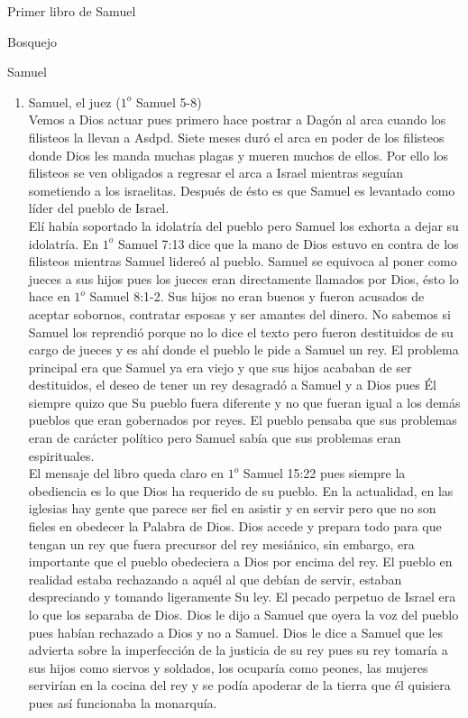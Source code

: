 \begin{section}{Primer libro de Samuel}
\begin{subsection}{Bosquejo}
\begin{subsubsection}{Samuel}
\begin{enumerate}
				\item Samuel, el juez ($1^{o}$ Samuel 5-8)\\
					Vemos a Dios actuar pues primero hace postrar a Dagón al arca cuando los filisteos la llevan a Asdpd. Siete meses duró el arca en poder de los filisteos donde Dios les manda muchas plagas y mueren muchos de ellos. Por ello los filisteos se ven obligados a regresar el arca a Israel mientras seguían sometiendo a los israelitas. Después de ésto es que Samuel es levantado como líder del pueblo de Israel. \\
					Elí había soportado la idolatría del pueblo pero Samuel los exhorta a dejar su idolatría. En $1^{o}$ Samuel 7:13 dice que la mano de Dios estuvo en contra de los filisteos mientras Samuel lidereó al pueblo. Samuel se equivoca al poner como jueces a sus hijos pues los jueces eran directamente llamados por Dios, ésto lo hace en $1^{o}$ Samuel 8:1-2. Sus hijos no eran buenos y fueron acusados de aceptar sobornos, contratar esposas y ser amantes del dinero. No sabemos si Samuel los reprendió porque no lo dice el texto pero fueron destituidos de su cargo de jueces y es ahí donde el pueblo le pide a Samuel un rey. El problema principal era que Samuel ya era viejo y que sus hijos acababan de ser destituidos, el deseo de tener un rey desagradó a Samuel y a Dios pues Él siempre quizo que Su pueblo fuera diferente y no que fueran igual a los demás pueblos que eran gobernados por reyes. El pueblo pensaba que sus problemas eran de carácter político pero Samuel sabía que sus problemas eran espirituales.\\
					El mensaje del libro queda claro en $1^{o}$ Samuel 15:22 pues siempre la obediencia es lo que Dios ha requerido de su pueblo. En la actualidad, en las iglesias hay gente que parece ser fiel en asistir y en servir pero que no son fieles en obedecer la Palabra de Dios.
					\newpage
					Dios accede y prepara todo para que tengan un rey que fuera precursor del rey mesiánico, sin embargo, era importante que el pueblo obedeciera a Dios por encima del rey. El pueblo en realidad estaba rechazando a aquél al que debían de servir, estaban despreciando y tomando ligeramente Su ley. El pecado perpetuo de Israel era lo que los separaba de Dios. Dios le dijo a Samuel que oyera la voz del pueblo pues habían rechazado a Dios y no a Samuel. Dios le dice a Samuel que les advierta sobre la imperfección de la justicia de su rey pues su rey tomaría a sus hijos como siervos y soldados, los ocuparía como peones, las mujeres servirían en la cocina del rey y se podía apoderar de la tierra que él quisiera pues así funcionaba la monarquía.


\end{enumerate}
\end{subsubsection}
\end{subsection}
\end{section}
